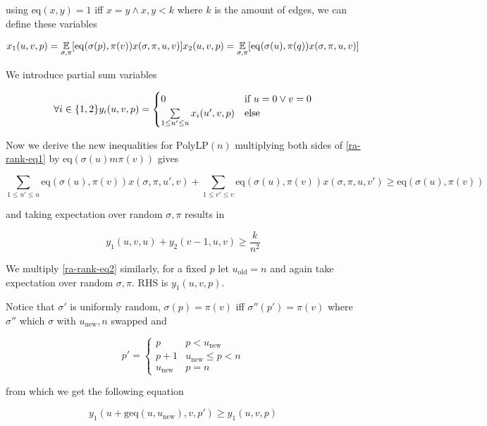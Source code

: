 using $\mathrm{eq}(x,y)=1$ iff $x=y\land x,y<k$ where $k$ is the amount of edges, we can define these variables

\[
x_1(u,v,p)=\underset{\sigma,\pi}{\mathbb{E}}[\mathrm{eq}(\sigma(p),\pi(v))x(\sigma,\pi,u,v)]\\
x_2(u,v,p)=\underset{\sigma,\pi}{\mathbb{E}}[\mathrm{eq}(\sigma(u),\pi(q))x(\sigma,\pi,u,v)]
\]

We introduce partial sum variables

\[\forall i\in\{1,2\}\\
y_i(u,v,p)=\begin{cases}
0 & \text{if }u=0\lor v=0\\
\sum\limits_{1\leq u'\leq u}x_i(u',v,p) & \text{else}
\end{cases}\]

Now we derive the new inequalities for $\mathrm{PolyLP}(n)$
multiplying both sides of \autoref{ra-rank-eq1} by $\mathrm{eq}(\sigma(u)m\pi(v))$ gives

\[\sum\limits_{1\leq u'\leq u}\mathrm{eq}(\sigma(u),\pi(v))x(\sigma,\pi,u',v)+\sum\limits_{1\leq v'\leq v}\mathrm{eq}(\sigma(u),\pi(v))x(\sigma,\pi,u,v')\geq\mathrm{eq}(\sigma(u),\pi(v))\]

and taking expectation over random $\sigma,\pi$ results in

\begin{equation}
	\label{ra-rank-eq4}
	y_1(u,v,u)+y_2(v-1,u,v)\geq \frac{k}{n^2}
\end{equation}

We multiply \autoref{ra-rank-eq2} similarly, for a fixed $p$ let $u_{\mathrm{old}}=n$ and again take expectation over random $\sigma,\pi$. RHS is $y_1(u,v,p)$.

Notice that $\sigma'$ is uniformly random, $\sigma(p)=\pi(v)$ iff $\sigma''(p')=\pi(v)$ where $\sigma''$ which $\sigma$ with $u_{\mathrm{new}},n$ swapped and

\[p'=\begin{cases}
	p                & p<u_{\mathrm{new}}\\
	p+1              & u_{\mathrm{new}}\leq p < n\\
	u_{\mathrm{new}} & p=n
\end{cases}\]

from which we get the following equation

\begin{equation}
	\label{ra-rank-eq5}
	y_1(u+\mathrm{geq}(u,u_{\mathrm{new}}),v,p')\geq y_1(u,v,p)
\end{equation}


